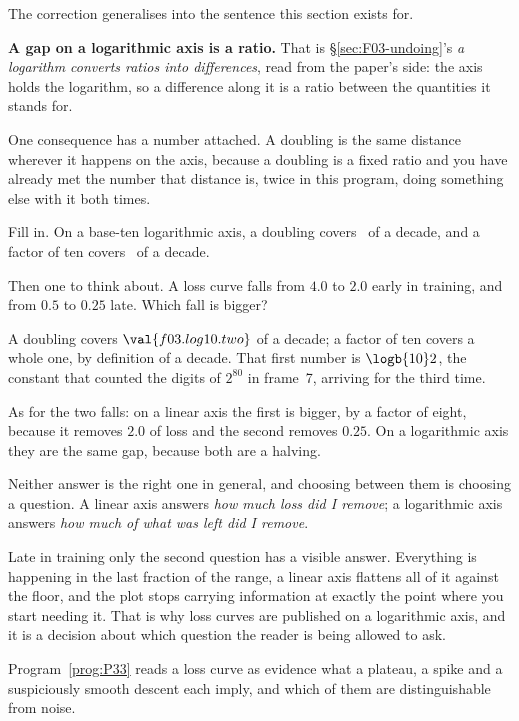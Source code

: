 \begin{fr}
The correction generalises into the sentence this section exists for.

\textbf{A gap on a logarithmic axis is a ratio.} That is
\S\ref{sec:F03-undoing}'s \emph{a logarithm converts ratios into differences},
read from the paper's side: the axis holds the logarithm, so a difference along
it is a ratio between the quantities it stands for.

One consequence has a number attached. A doubling is the same distance
wherever it happens on the axis, because a doubling is a fixed ratio \dash{}
and you have already met the number that distance is, twice in this program,
doing something else with it both times.

Fill in. On a base-ten logarithmic axis, a doubling covers \blank\ of a
decade, and a factor of ten covers \blank\ of a decade.

Then one to think about. A loss curve falls from $\num{4.0}$ to $\num{2.0}$
early in training, and from $\num{0.5}$ to $\num{0.25}$ late. Which fall is
bigger?
\dotline
\nextframe
\end{fr}

\begin{fr}
\begin{ansblock}
A doubling covers $\val{f03.log10.two}$ of a decade; a factor of ten covers a
whole one, by definition of a decade. That first number is $\logb{10} 2$, the
constant that counted the digits of $2^{80}$ in frame~7, arriving for the
third time.

As for the two falls: on a linear axis the first is bigger, by a factor of
eight, because it removes $\num{2.0}$ of loss and the second removes
$\num{0.25}$. On a logarithmic axis they are the same gap, because both are a
halving.
\end{ansblock}

Neither answer is the right one in general, and choosing between them is
choosing a question. A linear axis answers \emph{how much loss did I remove};
a logarithmic axis answers \emph{how much of what was left did I remove}.

Late in training only the second question has a visible answer. Everything is
happening in the last fraction of the range, a linear axis flattens all of it
against the floor, and the plot stops carrying information at exactly the point
where you start needing it. That is why loss curves are published on a
logarithmic axis, and it is a decision about which question the reader is being
allowed to ask.

Program~\ref{prog:P33} reads a loss curve as evidence \dash{} what a plateau, a
spike and a suspiciously smooth descent each imply, and which of them are
distinguishable from noise.
\end{fr}

